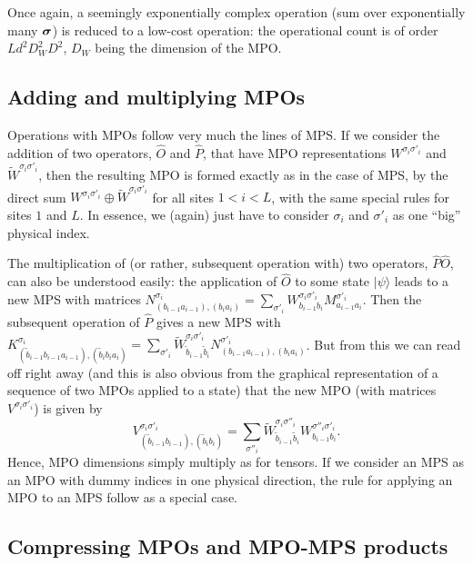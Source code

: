 \documentclass[a4paper,10pt,oneside,onecolumn,1p,times]{elsarticle}
\newcommand{\ket}[1]{\mbox{$| #1  \rangle$}}
\newcommand{\fat}[1]{\mbox{\boldmath$#1$\unboldmath}}	%
\begin{document}
Once again, a seemingly exponentially complex operation (sum over exponentially many $\fat{\sigma}$) is reduced to a low-cost operation: the operational count is of order 
$Ld^2 D_W^2 D^2$, $D_W$ being the dimension of the MPO.

\subsection{Adding and multiplying MPOs}

Operations with MPOs follow very much the lines of MPS. If we consider the addition of two operators, $\hat{O}$ and $\hat{P}$, that have MPO representations $W^{\sigma_i\sigma'_i}$ and 
$\tilde{W}^{\sigma_i\sigma'_i}$, then the resulting MPO is formed exactly as in the case of MPS, by the direct sum $W^{\sigma_i\sigma'_i} \oplus \tilde{W}^{\sigma_i\sigma'_i}$ for all sites $1 < i < L$, with the same special rules for sites $1$ and $L$. In essence, we (again) just have to consider $\sigma_i$ and $\sigma'_i$ as one ``big'' physical index. 

The multiplication of (or rather, subsequent operation with) two operators, $\hat{P} \hat{O}$, can also be understood easily: the application of $\hat{O}$ to some state $\ket{\psi}$ leads to a new MPS with 
matrices $N^{\sigma_i}_{(b_{i-1}a_{i-1}),(b_i a_i)} = \sum_{\sigma'_i} W^{\sigma_i\sigma'_i}_{b_{i-1}b_i} M^{\sigma'_i}_{a_{i-1}a_i}$. Then the subsequent operation of $\hat{P}$ gives a new MPS with $K^{\sigma_i}_{(\tilde{b}_{i-1}b_{i-1}a_{i-1}),(\tilde{b}_i b_i a_i)} =  \sum_{\sigma'_i} \tilde{W}^{\sigma_i\sigma'_i}_{\tilde{b}_{i-1} \tilde{b}_i} N^{\sigma'_i}_{(b_{i-1}a_{i-1}),(b_i a_i)}$. But from this we can read off right away (and this is also obvious from the graphical representation of a sequence of two MPOs applied to a state) that the new MPO (with matrices $V^{\sigma_i\sigma'_i}$) is given by
\begin{equation}
V^{\sigma_i\sigma'_i}_{(\tilde{b}_{i-1}b_{i-1}),(\tilde{b}_{i}b_{i})} = \sum_{\sigma''_i} 
\tilde{W}^{\sigma_i\sigma''_i}_{\tilde{b}_{i-1} \tilde{b}_i} W^{\sigma''_i\sigma'_i}_{b_{i-1}b_i} .
\end{equation}
Hence, MPO dimensions simply multiply as for tensors. If we consider an MPS as an MPO with dummy indices in one physical direction, the rule for applying an MPO to an MPS follow as a special case. 
 
\subsection{Compressing MPOs and MPO-MPS products}
\end{document}
